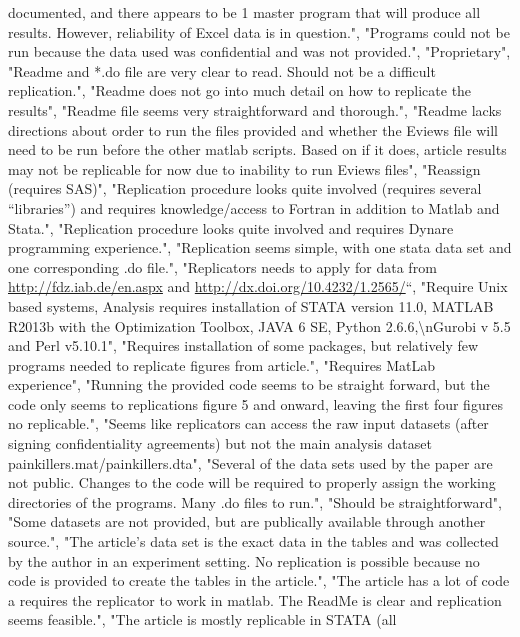\documentclass[]{article}
\begin{document}
\begin{itemize}
  documented, and there appears to be 1 master program that will produce
  all results. However, reliability of Excel data is in question.",
  "Programs could not be run because the data used was confidential and
  was not provided.", "Proprietary", "Readme and *.do file are very
  clear to read. Should not be a difficult replication.", "Readme does
  not go into much detail on how to replicate the results", "Readme file
  seems very straightforward and thorough.", "Readme lacks directions
  about order to run the files provided and whether the Eviews file will
  need to be run before the other matlab scripts. Based on if it does,
  article results may not be replicable for now due to inability to run
  Eviews files", "Reassign (requires SAS)", "Replication procedure looks
  quite involved (requires several ``libraries'') and requires
  knowledge/access to Fortran in addition to Matlab and Stata.",
  "Replication procedure looks quite involved and requires Dynare
  programming experience.", "Replication seems simple, with one stata
  data set and one corresponding .do file.", "Replicators needs to apply
  for data from \url{http://fdz.iab.de/en.aspx} and
  \url{http://dx.doi.org/10.4232/1.2565/}``, "Require Unix based
  systems, Analysis requires installation of STATA version 11.0, MATLAB
  R2013b with the Optimization Toolbox, JAVA 6 SE, Python
  2.6.6,\textbackslash{}nGurobi v 5.5 and Perl v5.10.1", "Requires
  installation of some packages, but relatively few programs needed to
  replicate figures from article.", "Requires MatLab experience",
  "Running the provided code seems to be straight forward, but the code
  only seems to replications figure 5 and onward, leaving the first four
  figures no replicable.", "Seems like replicators can access the raw
  input datasets (after signing confidentiality agreements) but not the
  main analysis dataset painkillers.mat/painkillers.dta", "Several of
  the data sets used by the paper are not public. Changes to the code
  will be required to properly assign the working directories of the
  programs. Many .do files to run.", "Should be straightforward", "Some
  datasets are not provided, but are publically available through
  another source.", "The article's data set is the exact data in the
  tables and was collected by the author in an experiment setting. No
  replication is possible because no code is provided to create the
  tables in the article.", "The article has a lot of code a requires the
  replicator to work in matlab. The ReadMe is clear and replication
  seems feasible.", "The article is mostly replicable in STATA (all

\end{itemize}
\end{document}
